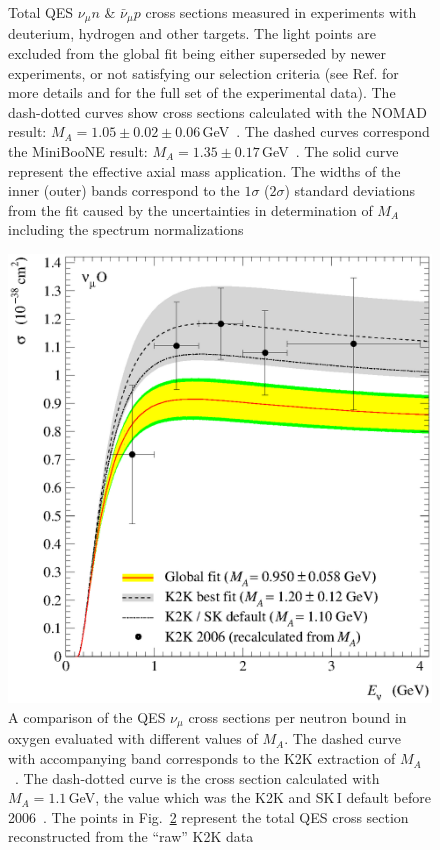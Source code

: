 \begin{figure}[htb!]
\caption{\label{TotalCS}Total QES $\nu_{\mu}n$ \& $\bar\nu_{\mu}p$ cross sections measured in experiments with deuterium, hydrogen and other targets. The light points are excluded from the global fit being either superseded by newer experiments, or not satisfying our selection criteria (see Ref.\cite{Kuzmin:2007kr} for more details and for the full set of the experimental data). The dash-dotted curves show cross sections calculated with the NOMAD result: $M_A=1.05\pm0.02\pm0.06$\,GeV~\cite{Lyubushkin:2008pe}. The dashed curves correspond the MiniBooNE result: $M_{A}=1.35\pm0.17$\,GeV~\cite{AguilarArevalo:2010zc}. The solid curve represent the effective axial mass application. The widths of the inner (outer) bands correspond to the $1\sigma$ ($2\sigma$) standard deviations from the fit caused by the uncertainties in determination of $M_{A}$ including the spectrum normalizations}
\end{figure}

\begin{figure}[htb!]
\begin{center}
\includegraphics[width=0.9\columnwidth]{./QES/sQESCC_K2K06_101.3.00.301.00_2_BBBA25_SM.eps}
\caption{\label{K2K}A comparison of the QES $\nu_{\mu}$ cross sections per neutron bound in oxygen evaluated with different values of $M_{A}$. The dashed curve with accompanying band corresponds to the K2K extraction of $M_{A}$~\cite{Gran:2006jn}. The dash-dotted curve is the cross section calculated with $M_{A}=1.1$\,GeV, the value which was the K2K and SK\,I default before 2006~\cite{Gran:2006jn,Ashie:2005ik}. The points in Fig.~\ref{K2K} represent the total QES cross section reconstructed from the ``raw'' K2K data}
\end{center}
\end{figure}

